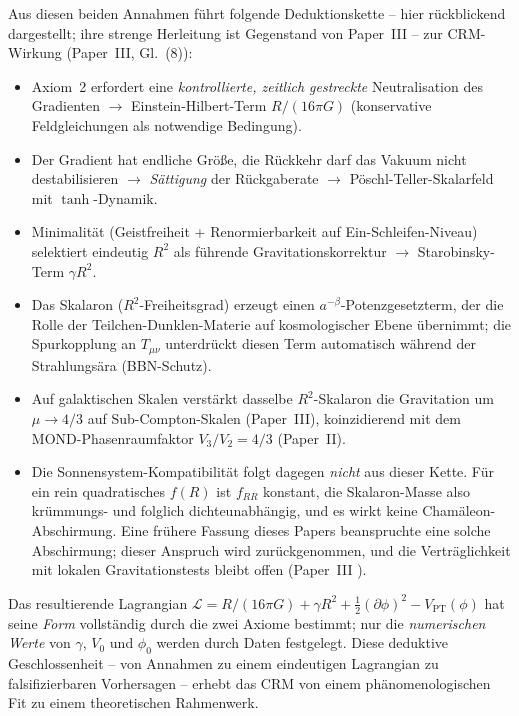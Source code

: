 \documentclass[aps,prd,twocolumn,superscriptaddress,nofootinbib]{revtex4-2}
\begin{document}
Aus diesen beiden Annahmen f\"uhrt folgende Deduktionskette -- hier r\"uckblickend dargestellt; ihre strenge Herleitung ist Gegenstand von Paper~III -- zur CRM-Wirkung (Paper~III, Gl.~(8)):
\begin{itemize}
\item Axiom~2 erfordert eine \textit{kontrollierte, zeitlich gestreckte} Neutralisation des Gradienten $\to$ Einstein-Hilbert-Term $R/(16\pi G)$ (konservative Feldgleichungen als notwendige Bedingung).
\item Der Gradient hat endliche Gr\"o\ss{}e, die R\"uckkehr darf das Vakuum nicht destabilisieren $\to$ \textit{S\"attigung} der R\"uckgaberate $\to$ P\"oschl-Teller-Skalarfeld mit $\tanh$-Dynamik.
\item Minimalit\"at (Geistfreiheit + Renormierbarkeit auf Ein-Schleifen-Niveau) selektiert eindeutig $R^2$ als f\"uhrende Gravitationskorrektur $\to$ Starobinsky-Term $\gamma R^2$.
\item Das Skalaron ($R^2$-Freiheitsgrad) erzeugt einen $a^{-\beta}$-Potenzgesetzterm, der die Rolle der Teilchen-Dunklen-Materie auf kosmologischer Ebene \"ubernimmt; die Spurkopplung an $T_{\mu\nu}$ unterdr\"uckt diesen Term automatisch w\"ahrend der Strahlungs\"ara (BBN-Schutz).
\item Auf galaktischen Skalen verst\"arkt dasselbe $R^2$-Skalaron die Gravitation um $\mu \to 4/3$ auf Sub-Compton-Skalen (Paper~III), koinzidierend mit dem MOND-Phasenraumfaktor $V_3/V_2 = 4/3$ (Paper~II).
\item Die Sonnensystem-Kompatibilit\"at folgt dagegen \textit{nicht} aus dieser Kette. F\"ur ein rein quadratisches $f(R)$ ist $f_{RR}$ konstant, die Skalaron-Masse also kr\"ummungs- und folglich dichteunabh\"angig, und es wirkt keine Cham\"aleon-Abschirmung. Eine fr\"uhere Fassung dieses Papers beanspruchte eine solche Abschirmung; dieser Anspruch wird zur\"uckgenommen, und die Vertr\"aglichkeit mit lokalen Gravitationstests bleibt offen (Paper~III \cite{Geiger2026c}).
\end{itemize}

Das resultierende Lagrangian $\mathcal{L} = R/(16\pi G) + \gamma R^2 + \frac{1}{2}(\partial\phi)^2 - V_{\mathrm{PT}}(\phi)$ hat seine \textit{Form} vollst\"andig durch die zwei Axiome bestimmt; nur die \textit{numerischen Werte} von $\gamma$, $V_0$ und $\phi_0$ werden durch Daten festgelegt. Diese deduktive Geschlossenheit -- von Annahmen zu einem eindeutigen Lagrangian zu falsifizierbaren Vorhersagen -- erhebt das CRM von einem ph\"anomenologischen Fit zu einem theoretischen Rahmenwerk.
\end{document}
